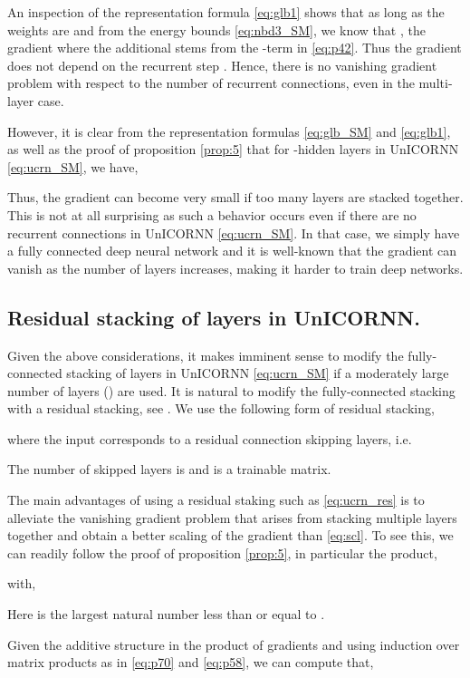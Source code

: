 \documentclass[a4paper]{article}
\begin{document}
An inspection of the representation formula \eqref{eq:glb1} shows that as long as the weights are  and from the energy bounds \eqref{eq:nbd3_SM}, we know that , the gradient 
where the additional  stems from the -term in \eqref{eq:p42}. Thus the gradient does not depend on the recurrent step . Hence, there is no vanishing gradient problem with respect to the number of recurrent connections, even in the multi-layer case. 

However, it is clear from the representation formulas \eqref{eq:glb_SM} and \eqref{eq:glb1}, as well as the proof of proposition \ref{prop:5} that for -hidden layers in UnICORNN \eqref{eq:ucrn_SM}, we have,

Thus, the gradient can become very small if too many layers are stacked together. This is not at all surprising as such a behavior occurs even if there are no recurrent connections in UnICORNN \eqref{eq:ucrn_SM}. In that case, we simply have a fully connected deep neural network and it is well-known that the gradient can vanish as the number of layers increases, making it harder to train deep networks. 
\subsection{Residual stacking of layers in UnICORNN.}
\label{resnet_grad}
Given the above considerations, it makes imminent sense to modify the fully-connected stacking of layers in UnICORNN \eqref{eq:ucrn_SM} if a moderately large number of layers () are used. It is natural to modify the fully-connected stacking with a residual stacking, see \cite{deep_indrnn}. We use the following form of residual stacking,

where the input  corresponds to a residual connection skipping  layers, i.e.

The number of skipped layers is  and  is a trainable matrix. 

The main advantages of using a residual staking such as \eqref{eq:ucrn_res} is to alleviate the vanishing gradient problem that arises from stacking multiple layers together and obtain a better scaling of the gradient than \eqref{eq:scl}. To see this, we can readily follow the proof of proposition \ref{prop:5}, in particular the product,

with,

Here  is the largest natural number less than or equal to .

Given the additive structure in the product of gradients and using induction over matrix products as in \eqref{eq:p70} and \eqref{eq:p58}, we can compute that,
\end{document}

